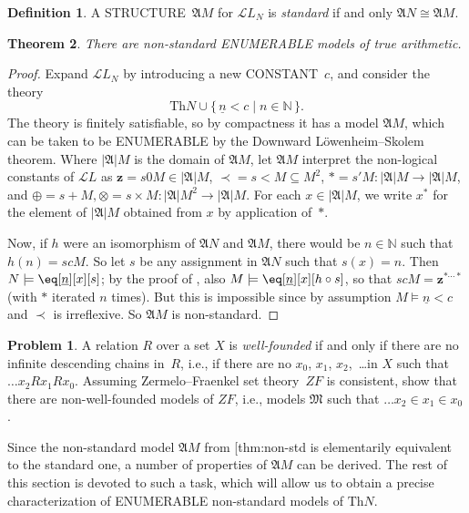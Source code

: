 \documentclass[10pt,a4paper]{article}
\makeatletter
\newcommand*{\olup}[1]{\MakeUppercase{#1}}
\theoremstyle{plain}
\newtheorem{thm}{Theorem}[section]
\theoremstyle{definition}
\newtheorem{defn}[thm]{Definition}
\newtheorem{prob}{Problem}[section]
\theoremstyle{remark}
\newcommand*{\ollabel}[1]{\label{#1}}
\newcommand{\olref}{\@ifnextchar[{\olref@i}{\olref@final}}
\def\olref@i[#1]{\@ifnextchar[{\olref@ii}{\olref@final}}
\def\olref@ii[#1]{\@ifnextchar[{\olref@iii}{\olref@final}}
\def\olref@iii[#1]{\olref@final}
\def\olref@final#1{\ref{#1}}
\providecommand{\Obj}{}
\providecommand{\Struct}{\ensuremath{\mathfrak{A}}}
\providecommand{\Domain}{\ensuremath{|\mathfrak{A}|}}
\providecommand{\Assign}{\ensuremath{s}}
\providecommand{\Sat}[2]{\ensuremath{#1 \models #2}}
\providecommand{\Lang}{\ensuremath{\mathcal{L}}}
\providecommand{\num}[1]{\underline{#1}}
\providecommand{\Nat}{\ensuremath{\mathbb{N}}}
\providecommand{\Setabs}[2]{\{\, #1 \mid #2 \,\}}
\providecommand{\iso}{\cong}
\providecommand{\Theory}{\mathrm{Th}}
\makeatother
\begin{document}
\begin{defn}
A \olup{structure}~$\Struct{M}$ for $\Lang{L_N}$ is \emph{standard} if
and only $\Struct{N} \iso \Struct{M}$.
\end{defn}

\begin{thm}\ollabel{thm:non-std}
There are non-standard \olup{enumerable} models of true arithmetic.
\end{thm}

\begin{proof}
Expand $\Lang{L_N}$ by introducing a new \olup{constant}~$c$, and
consider the theory
\[
\Theory{N} \cup \Setabs{\num{n} < c}{n \in \Nat}.
\]
The theory is finitely satisfiable, so by compactness it has a model
$\Struct{M}$, which can be taken to be \olup{enumerable} by the Downward
L\"owenheim--Skolem theorem. Where $\Domain{M}$ is the domain of
$\Struct{M}$, let $\Struct{M}$ interpret the non-logical constants of
$\Lang{L}$ as $\mathbf{z} = \Assign{\Obj{0}}{M} \in \Domain{M}$, ${\prec} =
\Assign{<}{M} \subseteq M^2$, $* = \Assign{\prime}{M} \colon
\Domain{M} \to \Domain{M}$, and $\oplus = \Assign{+}{M}, \otimes =
\Assign{\times}{M} \colon \Domain{M}^2 \to \Domain{M}$. For each $x
\in \Domain{M}$, we write $x^*$ for the element of $\Domain{M}$
obtained from $x$ by application of~$*$.

Now, if $h$ were an isomorphism of $\Struct{N}$ and $\Struct{M}$,
there would be $n \in \Nat$ such that $h(n) = \Assign{c}{M}$.  So let
$s$ be any assignment in $\Struct{N}$ such that $s(x) = n$. Then
$\Sat{N}{\eq[\num{n}][x]}[s]$; by the proof of \olref[iso]{thm:isom},
also $\Sat{M}{\eq[\num{n}][x]}[h \circ s]$, so that $\Assign{c}{M} =
\mathbf{z}^{*\cdots *}$ (with $*$ iterated $n$ times). But this is impossible
since by assumption $\Sat{M}{\num{n} < c}$ and $\prec$ is
irreflexive. So $\Struct{M}$ is non-standard.
\end{proof}

\begin{prob}
A relation $R$ over a set $X$ is \emph{well-founded} if and only if
there are no infinite descending chains in~$R$, i.e., if there are no
$x_0$, $x_1$, $x_2$,~\dots in $X$ such that $\dots x_2Rx_1Rx_0$.  Assuming
Zermelo--Fraenkel set theory~$ZF$ is consistent, show that there are
non-well-founded models of $ZF$, i.e., models $\mathfrak{M}$ such that
$\dots x_2 \in x_1 \in x_0$.
\end{prob}

Since the non-standard model $\Struct{M}$ from \olref{thm:non-std} is
elementarily equivalent to the standard one, a number of properties of
$\Struct{M}$ can be derived. The rest of this section is devoted to
such a task, which will allow us to obtain a precise characterization
of \olup{enumerable} non-standard models of $\Theory{N}$.
\end{document}
